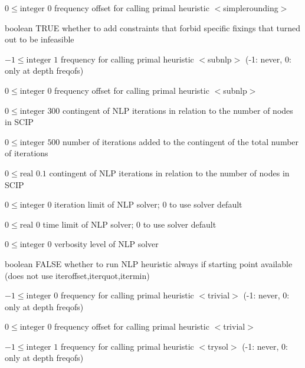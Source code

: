 %
{$0\leq\textrm{integer}$}%
{$0$}%
{frequency offset for calling primal heuristic $<$simplerounding$>$}%
{}

%
{boolean}%
{TRUE}%
{whether to add constraints that forbid specific fixings that turned out to be infeasible}%
{}

%
{$-1\leq\textrm{integer}$}%
{$1$}%
{frequency for calling primal heuristic $<$subnlp$>$ (-1: never, 0: only at depth freqofs)}%
{}

%
{$0\leq\textrm{integer}$}%
{$0$}%
{frequency offset for calling primal heuristic $<$subnlp$>$}%
{}

%
{$0\leq\textrm{integer}$}%
{$300$}%
{contingent of NLP iterations in relation to the number of nodes in SCIP}%
{}

%
{$0\leq\textrm{integer}$}%
{$500$}%
{number of iterations added to the contingent of the total number of iterations}%
{}

%
{$0\leq\textrm{real}$}%
{$0.1$}%
{contingent of NLP iterations in relation to the number of nodes in SCIP}%
{}

%
{$0\leq\textrm{integer}$}%
{$0$}%
{iteration limit of NLP solver; 0 to use solver default}%
{}

%
{$0\leq\textrm{real}$}%
{$0$}%
{time limit of NLP solver; 0 to use solver default}%
{}

%
{$0\leq\textrm{integer}$}%
{$0$}%
{verbosity level of NLP solver}%
{}

%
{boolean}%
{FALSE}%
{whether to run NLP heuristic always if starting point available (does not use iteroffset,iterquot,itermin)}%
{}

%
{$-1\leq\textrm{integer}$}%
{$0$}%
{frequency for calling primal heuristic $<$trivial$>$ (-1: never, 0: only at depth freqofs)}%
{}

%
{$0\leq\textrm{integer}$}%
{$0$}%
{frequency offset for calling primal heuristic $<$trivial$>$}%
{}

%
{$-1\leq\textrm{integer}$}%
{$1$}%
{frequency for calling primal heuristic $<$trysol$>$ (-1: never, 0: only at depth freqofs)}%
{}

